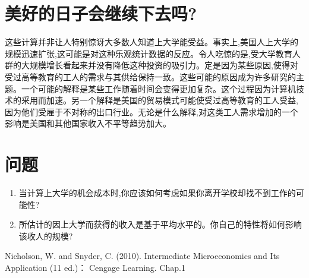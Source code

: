 \documentclass[10pt, a4paper]{ctexart} %
\begin{document}
\section*{美好的日子会继续下去吗?}
这些计算并非让人特别惊讶大多数人知道上大学能受益。事实上,美国人上大学的规模迅速扩张,这可能是对这种乐观统计数据的反应。令人吃惊的是,受大学教育人群的大规模增长看起来并没有降低这种投资的吸引力。定是因为某些原因,使得对受过高等教育的工人的需求与其供给保持一致。这些可能的原因成为许多研究的主题。一个可能的解释是某些工作随着时间会变得更加复杂。这个过程因为计算机技术的采用而加速。另一个解释是美国的贸易模式可能使受过高等教育的工人受益,因为他们受雇于不对称的出口行业。无论是什么解释,对这类工人需求增加的一个影响是美国和其他国家收入不平等趋势加大。




\section*{问题}
\begin{enumerate}
	\item 当计算上大学的机会成本时,你应该如何考虑如果你离开学校却找不到工作的可能性?
	\item 所估计的因上大学而获得的收入是基于平均水平的。你自己的特性将如何影响该收人的规模?
\end{enumerate}




\small
\begin{thebibliography}{99}
	\setlength{\parskip}{0pt} %
	 Nicholson, W. and Snyder, C. (2010). Intermediate Microeconomics and Its Application (11 ed.)： Cengage Learning. Chap.1
	\end {thebibliography}
\end{document}
